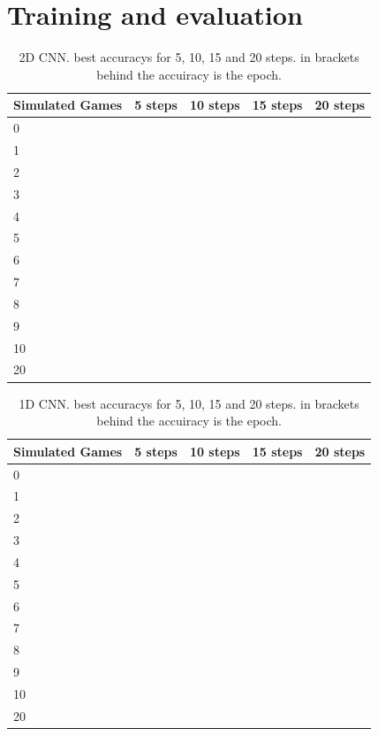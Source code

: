 \section{Training and evaluation}

\begin{table}[H]
	\centering
	\caption{2D CNN. best accuracys for 5, 10, 15 and 20 steps. in brackets behind the accuiracy is the epoch.}%
	\begin{tabular}{|l|l|l|l|l|}
		\hline
		Simulated Games & 5 steps & 10 steps & 15 steps& 20 steps\\
		\hline
		0 &   & && \\
		1 &  & && \\
		2 &  & && \\
		3 &  & && \\
		4 &  & && \\
		5 & &&& \\
		6 &  & && \\
		7 &  & && \\
		8 &  & && \\
		9 &  & && \\
		10 & &&& \\
		20 & &&& \\
		\hline
	\end{tabular}
\end{table}

\begin{table}[H]
	\centering
	\caption{1D CNN. best accuracys for 5, 10, 15 and 20 steps. in brackets behind the accuiracy is the epoch.}%
	\begin{tabular}{|l|l|l|l|l|}
		\hline
		Simulated Games & 5 steps & 10 steps & 15 steps& 20 steps\\
		\hline
		0 &   & && \\
		1 &  & && \\
		2 &  & && \\
		3 &  & && \\
		4 &  & && \\
		5 & &&& \\
		6 &  & && \\
		7 &  & && \\
		8 &  & && \\
		9 &  & && \\
		10 & &&& \\
		20 & &&& \\
		\hline
	\end{tabular}
\end{table}


